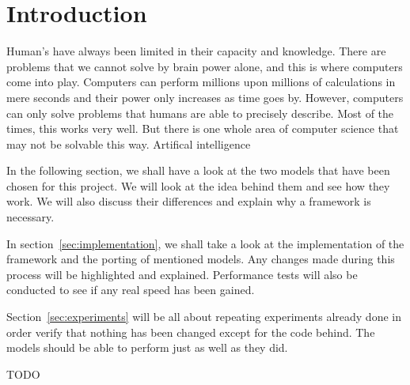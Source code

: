 \section{Introduction}
Human's have always been limited in their capacity and knowledge. There are problems that we cannot solve by brain power alone, and this is where computers come into play. Computers can perform millions upon millions of calculations in mere seconds and their power only increases as time goes by. However, computers can only solve problems that humans are able to precisely describe. Most of the times, this works very well. But there is one whole area of computer science that may not be solvable this way. Artifical intelligence 


In the following section, we shall have a look at the two models that have been chosen for this project. We will look at the idea behind them and see how they work. We will also discuss their differences and explain why a framework is necessary.

In section~\ref{sec:implementation}, we shall take a look at the implementation of the framework and the porting of mentioned models. Any changes made during this process will be highlighted and explained. Performance tests will also be conducted to see if any real speed has been gained.

Section~\ref{sec:experiments} will be all about repeating experiments already done in order verify that nothing has been changed except for the code behind. The models should be able to perform just as well as they did.

TODO
